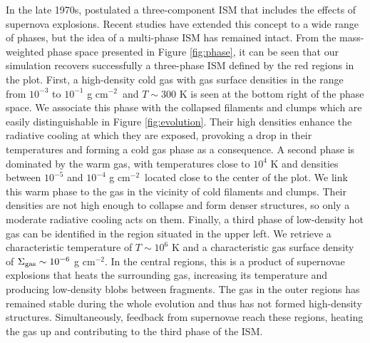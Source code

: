 \documentclass[twocolumn]{aastex}
\newcommand{\cmm}{cm$^{-2}$}
\newcommand{\sgas}{\Sigma_{\rm gas}}
\begin{document}
In the late 1970s, \citet{McKee_Ostriker_77} postulated a three-component ISM that includes the effects of supernova explosions. Recent studies have extended this concept to a wide range of phases, but the idea of a multi-phase ISM has remained intact. From the mass-weighted phase space presented in Figure \ref{fig:phase}, it can be seen that our simulation recovers successfully a three-phase ISM defined by the red regions in the plot. First, a high-density cold gas with gas surface densities in the range from $10^{-3}$ to $10^{-1}$ g \cmm~and $T \sim 300$ K is seen at the bottom right of the phase space. We associate this phase with the collapsed filaments and clumps which are easily distinguishable in Figure \ref{fig:evolution}. Their high densities enhance the radiative cooling at which they are exposed, provoking a drop in their temperatures and forming a cold gas phase as a consequence. A second phase is dominated by the warm gas, with temperatures close to $10^4$ K and densities between $10^{-5}$ and $10^{-4}$ g \cmm~located close to the center of the plot. We link this warm phase to the gas in the vicinity of cold filaments and clumps. Their densities are not high enough to collapse and form denser structures, so only a moderate radiative cooling acts on them. Finally, a third phase of low-density hot gas can be identified in the region situated in the upper left. We retrieve a characteristic temperature of $T \sim 10^6$ K and a characteristic gas surface density of $\sgas \sim 10^{-6}$ g \cmm. In the central regions, this is a product of supernovae explosions that heats the surrounding gas, increasing its temperature and producing low-density blobs between fragments. The gas in the outer regions has remained stable during the whole evolution and thus has not formed high-density structures. Simultaneously, feedback from supernovae reach these regions, heating the gas up and contributing to the third phase of the ISM.
\end{document}
